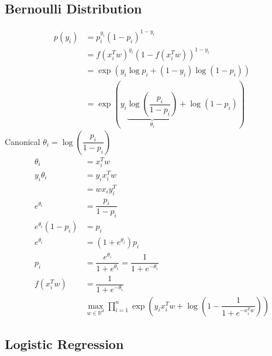 \documentclass{article}
\begin{document}
\subsection{Bernoulli Distribution}
\begin{align*}
p\left(y_{i}\right)  &= p_{i}^{y_{i}} \left(1 - p_{i}\right)^{1 - y_{i}}
\\ &= f\left(x_{i}^{T} w\right)^{y_{i}} \left(1 - f\left(x_{i}^{T} w\right)\right)^{1 - y_{i}}
\\ &= \exp\left(y_{i} \log p_{i} + \left(1 - y_{i}\right) \log \left(1 - p_{i}\right)\right)
\\ &= \exp\left(y_{i} \underbrace{\log \left(\dfrac{p_{i}}{1 - p_{i}}\right)}_{\theta_{i}} + \log \left(1 - p_{i}\right)\right)
\end{align*}
Canonical $\theta_{i} = \log \left(\dfrac{p_{i}}{1 - p_{i}}\right)$
\begin{align*}
\theta_{i} &= x_{i}^{T} w 
\\ y_{i} \theta_{i} &= y_{i} x_{i}^{T} w 
\\ &= w x_{i} y_{i}^{T}
\\ e^{\theta_{i}} &= \dfrac{p_{i}}{1 - p_{i}}
\\ e^{\theta_{i}} \left(1 - p_{i}\right) &= p_{i}
\\ e^{\theta_{i}} &= \left(1 + e^{\theta_{i}}\right) p_{i}
\\ p_{i} &= \dfrac{e^{\theta_{i}}}{1 + e^{\theta_{i}}} = \dfrac{1}{1 + e^{-\theta_{i}}}
\\ f\left(x_{i}^{T} w\right) &= \dfrac{1}{1 + e^{-\theta_{i}}}
\\ &  \displaystyle\max_{w \in \mathbb{R}^{d}} \displaystyle\prod_{i=1}^{n} \exp\left(y_{i} x_{i}^{T} w + \log\left(1 - \dfrac{1}{1 + e^{-x_{i}^{T} w}}\right)\right)
\end{align*}


\subsection{Logistic Regression}
\end{document}
